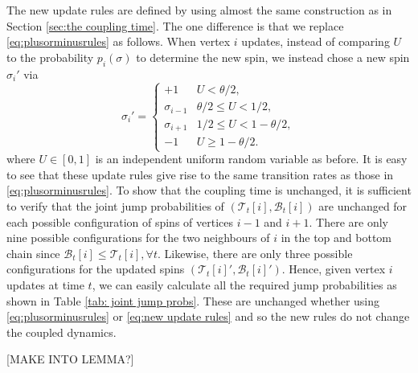 	The new update rules are defined by using almost the same construction as in Section \ref{sec:the coupling time}. The one difference is that we replace \eqref{eq:plusorminusrules} as follows. When vertex $i$ updates, instead of comparing $U$ to the probability $p_i(\sigma)$ to determine the new spin, we instead chose a new spin $\sigma_i'$ via
	\begin{equation}
	\label{eq:new update rules}
		\sigma_i' = \begin{cases}
			+1 & U < \theta/2,\\
			\sigma_{i-1} & \theta/2 \leq U < 1/2,\\
			\sigma_{i+1} & 1/2 \leq U < 1 - \theta/2,\\
			-1 & U \geq 1 - \theta/2.
		\end{cases}
	\end{equation}
	where $U \in [0,1]$ is an independent uniform random variable as before. It is easy to see that these update rules give rise to the same transition rates as those in \eqref{eq:plusorminusrules}. To show that the coupling time is unchanged, it is sufficient to verify that the joint jump probabilities of $(\mathscr{T}_t[i], \mathscr{B}_t[i])$ are unchanged for each possible configuration of spins of vertices $i-1$ and $i+1$. There are only nine possible configurations for the two neighbours of $i$ in the top and bottom chain since $\mathscr{B}_t[i] \leq \mathscr{T}_t[i], \forall t$. Likewise, there are only three possible configurations for the updated spins $(\mathscr{T}_t[i]', \mathscr{B}_t[i]')$. Hence, given vertex $i$ updates at time $t$, we can easily calculate all the required jump probabilities as shown in Table \ref{tab: joint jump probs}. These are unchanged whether using \eqref{eq:plusorminusrules} or \eqref{eq:new update rules} and so the new rules do not change the coupled dynamics.

	[MAKE INTO LEMMA?]

